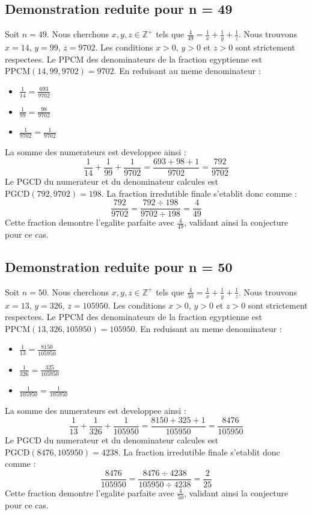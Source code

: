 \documentclass[11pt,a4paper]{article}
\begin{document}
\subsection{Demonstration reduite pour n = 49}
Soit $n = 49$. Nous cherchons $x, y, z \in \mathbb{Z}^{+}$ tels que $\frac{4}{49} = \frac{1}{x} + \frac{1}{y} + \frac{1}{z}$.
Nous trouvons $x = 14$, $y = 99$, $z = 9702$.
Les conditions $x > 0$, $y > 0$ et $z > 0$ sont strictement respectees.
Le PPCM des denominateurs de la fraction egyptienne est $\text{PPCM}(14, 99, 9702) = 9702$.
En reduisant au meme denominateur :
\begin{itemize}
    \item $\frac{1}{14} = \frac{693}{9702}$
    \item $\frac{1}{99} = \frac{98}{9702}$
    \item $\frac{1}{9702} = \frac{1}{9702}$
\end{itemize}
La somme des numerateurs est developpee ainsi :
$$ \frac{1}{14} + \frac{1}{99} + \frac{1}{9702} = \frac{693 + 98 + 1}{9702} = \frac{792}{9702} $$
Le PGCD du numerateur et du denominateur calcules est $\text{PGCD}(792, 9702) = 198$.
La fraction irredutible finale s'etablit donc comme :
$$ \frac{792}{9702} = \frac{792 \div 198}{9702 \div 198} = \frac{4}{49} $$
Cette fraction demontre l'egalite parfaite avec $\frac{4}{49}$, validant ainsi la conjecture pour ce cas.

\subsection{Demonstration reduite pour n = 50}
Soit $n = 50$. Nous cherchons $x, y, z \in \mathbb{Z}^{+}$ tels que $\frac{4}{50} = \frac{1}{x} + \frac{1}{y} + \frac{1}{z}$.
Nous trouvons $x = 13$, $y = 326$, $z = 105950$.
Les conditions $x > 0$, $y > 0$ et $z > 0$ sont strictement respectees.
Le PPCM des denominateurs de la fraction egyptienne est $\text{PPCM}(13, 326, 105950) = 105950$.
En reduisant au meme denominateur :
\begin{itemize}
    \item $\frac{1}{13} = \frac{8150}{105950}$
    \item $\frac{1}{326} = \frac{325}{105950}$
    \item $\frac{1}{105950} = \frac{1}{105950}$
\end{itemize}
La somme des numerateurs est developpee ainsi :
$$ \frac{1}{13} + \frac{1}{326} + \frac{1}{105950} = \frac{8150 + 325 + 1}{105950} = \frac{8476}{105950} $$
Le PGCD du numerateur et du denominateur calcules est $\text{PGCD}(8476, 105950) = 4238$.
La fraction irredutible finale s'etablit donc comme :
$$ \frac{8476}{105950} = \frac{8476 \div 4238}{105950 \div 4238} = \frac{2}{25} $$
Cette fraction demontre l'egalite parfaite avec $\frac{4}{50}$, validant ainsi la conjecture pour ce cas.
\end{document}
